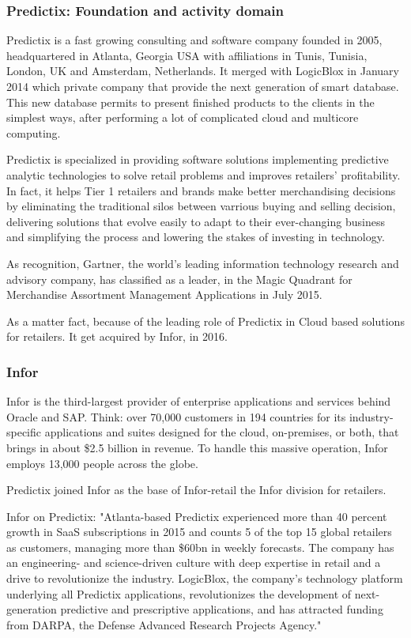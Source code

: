 \subsubsection{Predictix: Foundation and activity domain}

Predictix is a fast growing consulting and software company founded in 2005,
headquartered in Atlanta, Georgia USA with affiliations in Tunis, Tunisia,
London, UK and Amsterdam, Netherlands. It merged with LogicBlox in January 2014
which private company that provide the next generation of smart database. This
new database permits to present finished products to the clients in the simplest
ways, after performing a lot of complicated cloud and multicore computing.

Predictix is specialized in providing software solutions implementing predictive
analytic technologies to solve retail problems and improves retailers'
profitability. In fact, it helps Tier 1 retailers and brands make better
merchandising decisions  by eliminating the traditional silos between varrious
buying and selling decision, delivering solutions that evolve easily to adapt to
their ever-changing business and simplifying the process and lowering the stakes
of investing in technology.

As recognition, Gartner, the world's leading information technology research and
advisory company, has classified as a leader, in the Magic Quadrant for
Merchandise Assortment Management Applications in July 2015.

As a matter fact, because of the leading role of Predictix in Cloud based
solutions for retailers. It get acquired by Infor, in 2016.

\subsubsection{Infor}
Infor is the third-largest provider of enterprise applications and services
behind Oracle and SAP. Think: over 70,000 customers in 194 countries for its
industry-specific applications and suites designed for the cloud, on-premises,
or both, that brings in about \$2.5 billion in revenue. To handle this massive
operation, Infor employs 13,000 people across the globe.

Predictix joined Infor as the base of Infor-retail the Infor division for
retailers.

Infor on Predictix:
"Atlanta-based Predictix experienced more than 40 percent growth in SaaS
subscriptions in 2015 and counts 5 of the top 15 global retailers as customers,
managing more than \$60bn in weekly forecasts. The company has an engineering-
and science-driven culture with deep expertise in retail and a drive to
revolutionize the industry. LogicBlox, the company's technology platform
underlying all Predictix applications, revolutionizes the development of
next-generation predictive and prescriptive applications, and has attracted
funding from DARPA, the Defense Advanced Research Projects Agency."

